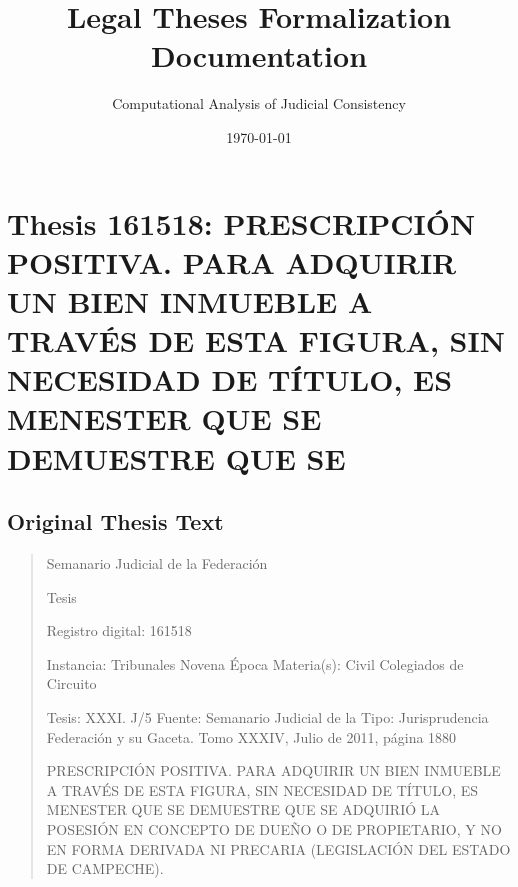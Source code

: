 \documentclass[11pt,a4paper]{article}
\title{Legal Theses Formalization Documentation}
\author{Computational Analysis of Judicial Consistency}
\date{\today}
\begin{document}
\maketitle
\tableofcontents
\newpage

\section{Thesis 161518: PRESCRIPCIÓN POSITIVA. PARA ADQUIRIR UN BIEN INMUEBLE A TRAVÉS DE ESTA FIGURA, SIN NECESIDAD DE TÍTULO, ES MENESTER QUE SE DEMUESTRE QUE SE}
\label{thesis:161518}

\subsection{Original Thesis Text}

\begin{quote}
                                                   Semanario Judicial de la Federación

                                                  Tesis

 Registro digital: 161518

 Instancia: Tribunales             Novena Época                           Materia(s): Civil
 Colegiados de Circuito

 Tesis: XXXI. J/5                  Fuente: Semanario Judicial de la  Tipo: Jurisprudencia
                                   Federación y su Gaceta.
                                   Tomo XXXIV, Julio de 2011, página
                                   1880


PRESCRIPCIÓN POSITIVA. PARA ADQUIRIR UN BIEN INMUEBLE A TRAVÉS DE ESTA
FIGURA, SIN NECESIDAD DE TÍTULO, ES MENESTER QUE SE DEMUESTRE QUE SE
ADQUIRIÓ LA POSESIÓN EN CONCEPTO DE DUEÑO O DE PROPIETARIO, Y NO EN FORMA
DERIVADA NI PRECARIA (LEGISLACIÓN DEL ESTADO DE CAMPECHE).



\end{quote}
\end{document}

